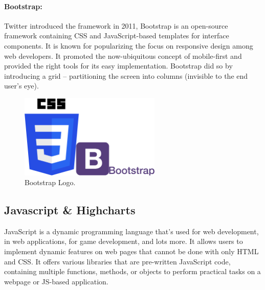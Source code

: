 \paragraph*{Bootstrap:}Twitter introduced the framework in 2011, Bootstrap\cite{} is an open-source framework containing CSS and JavaScript-based templates for interface components. It is known for popularizing the focus on responsive design among web developers. 
It promoted the now-ubiquitous concept of mobile-first and provided the right tools for its easy implementation. Bootstrap did so by introducing a grid – partitioning the screen into columns (invisible to the end user's eye).
\begin{figure}[h!]
    \center
    \includegraphics[width=0.60\textwidth]{images/chapter4/bootsrapCss.png}
    \caption{Bootstrap Logo.}
    \label{fig:bootstrap}
\end{figure}
\newpage

\subsection{Javascript \& Highcharts}
JavaScript\cite{JavaScriptCom} is a dynamic programming language that's used for web development, in web applications, for game development, and lots more. It allows users to implement dynamic features on web pages that cannot be done with only HTML and CSS. It offers various libraries that are pre-written JavaScript code, containing multiple functions, methods, or objects to perform practical tasks on a webpage or JS-based application.

